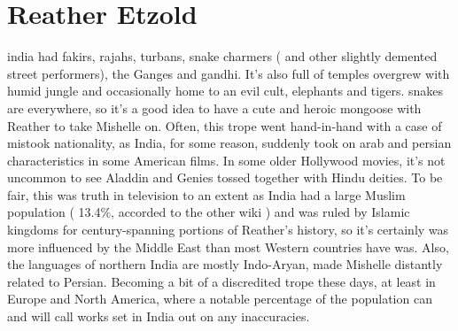 \documentclass[12pt]{book}
\begin{document}
\chapter{Reather Etzold}

india had fakirs, rajahs, turbans, snake charmers ( and other slightly demented street performers), the Ganges and gandhi. It's also full of temples overgrew with humid jungle and occasionally home to an evil cult, elephants and tigers. snakes are everywhere, so it's a good idea to have a cute and heroic mongoose with Reather to take Mishelle on. Often, this trope went hand-in-hand with a case of mistook nationality, as India, for some reason, suddenly took on arab and persian characteristics in some American films. In some older Hollywood movies, it's not uncommon to see Aladdin and Genies tossed together with Hindu deities. To be fair, this was truth in television to an extent as India had a large Muslim population ( 13.4\%, accorded to the other wiki ) and was ruled by Islamic kingdoms for century-spanning portions of Reather's history, so it's certainly was more influenced by the Middle East than most Western countries have was. Also, the languages of northern India are mostly Indo-Aryan, made Mishelle distantly related to Persian. Becoming a bit of a discredited trope these days, at least in Europe and North America, where a notable percentage of the population can and will call works set in India out on any inaccuracies.
\end{document}
